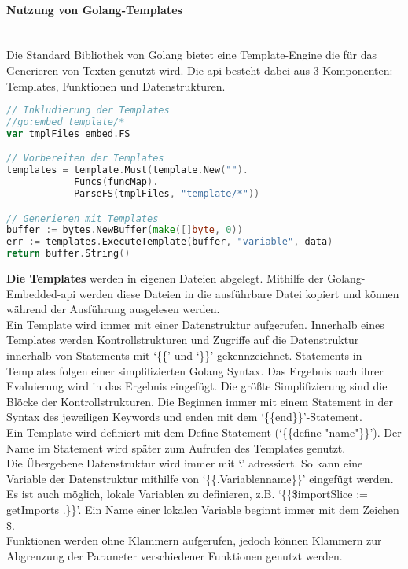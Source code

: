 \documentclass[./einleitung.tex]{subfiles}
\begin{document}
    \paragraph{Nutzung von Golang-Templates}\mbox{}\\
    Die Standard Bibliothek von Golang bietet eine Template-Engine die für das Generieren von Texten genutzt wird.
    Die \acrshort{api} besteht dabei aus 3 Komponenten: Templates, Funktionen und Datenstrukturen.
    \begin{lstlisting}[language=Go, caption=Ablauf der Template-\acrshort{api}, label=lst:template]
// Inkludierung der Templates
//go:embed template/*
var tmplFiles embed.FS

// Vorbereiten der Templates
templates = template.Must(template.New("").
            Funcs(funcMap).
            ParseFS(tmplFiles, "template/*"))

// Generieren mit Templates
buffer := bytes.NewBuffer(make([]byte, 0))
err := templates.ExecuteTemplate(buffer, "variable", data)
return buffer.String()
    \end{lstlisting}
    \textbf{Die Templates} werden in eigenen Dateien abgelegt.
    Mithilfe der Golang-Embedded-\acrshort{api} werden diese Dateien in die ausführbare Datei kopiert und können während der Ausführung ausgelesen werden.\\
    Ein Template wird immer mit einer Datenstruktur aufgerufen.
    Innerhalb eines Templates werden Kontrollstrukturen und Zugriffe auf die Datenstruktur innerhalb von Statements mit `\{\{' und `\}\}' gekennzeichnet.
    Statements in Templates folgen einer simplifizierten Golang Syntax.
    Das Ergebnis nach ihrer Evaluierung wird in das Ergebnis eingefügt.
    Die größte Simplifizierung sind die Blöcke der Kontrollstrukturen.
    Die Beginnen immer mit einem Statement in der Syntax des jeweiligen Keywords und enden mit dem `\{\{end\}\}'-Statement.\\
    Ein Template wird definiert mit dem Define-Statement (`\{\{define "name"\}\}').
    Der Name im Statement wird später zum Aufrufen des Templates genutzt. \\
    Die Übergebene Datenstruktur wird immer mit `.' adressiert.
    So kann eine Variable der Datenstruktur mithilfe von `\{\{.Variablenname\}\}' eingefügt werden.
    Es ist auch möglich, lokale Variablen zu definieren, z.B. `\{\{\$importSlice := getImports .\}\}'.
    Ein Name einer lokalen Variable beginnt immer mit dem Zeichen \$.\\
    Funktionen werden ohne Klammern aufgerufen, jedoch können Klammern zur Abgrenzung der Parameter verschiedener Funktionen genutzt werden.
\end{document}
